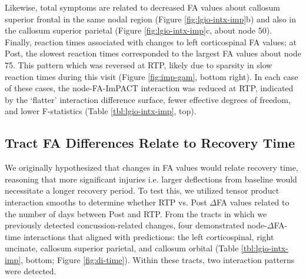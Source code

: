 \documentclass[]{imag-ms-template}
\begin{document}
\begin{table}[H]
	\scriptsize
	
	\caption{Longitudinal tract interaction statistics. \textbf{Top}: Tract by ImPACT metric interaction. While significant non-flatness is detected for all ImPACT-Node interactions, note the reduction in effective degrees of freedom and F-stat between Post and RTP. VisMem = Visual Memory, TotSymp = Total Symptom, RxTime = Reaction Time. Node = global node, ImP:Base/Post/RTP = main effects of ImPACT metric for each group, ImP-Node = interaction term of node and ImPACT, ImP-Node:O.Post/RTP = Post/RTP group interaction as an ordered factor (relative to Base). \textbf{Bottom}: Interaction of select tracts and days between Post and RTP. edf = effective degrees of freedom, F = F-statistic, Sig = significance. *** = p$<$.001, ** = p$<$.01, * = p$<$.05. See Figure \ref{fig:ldi-gam} for tract names.}
	\label{tbl:lgio-intx-imp}
\end{table}

Likewise, total symptoms are related to decreased FA values about callosum superior frontal in the same nodal region (Figure \ref{fig:lgio-intx-imp}b) and also in the callosum superior parietal (Figure \ref{fig:lgio-intx-imp}c, about node 50). Finally, reaction times associated with changes to left corticospinal FA values; at Post, the slowest reaction times corresponded to the largest FA values about node 75. This pattern which was reversed at RTP, likely due to sparsity in slow reaction times during this visit (Figure \ref{fig:imp-gam}, bottom right). In each case of these cases, the node-FA-ImPACT interaction was reduced at RTP, indicated by the `flatter' interaction difference surface, fewer effective degrees of freedom, and lower F-statistics (Table \ref{tbl:lgio-intx-imp}, top).


\subsection{Tract FA Differences Relate to Recovery Time}
\label{ssec:res-dwi-time}
We originally hypothesized that changes in FA values would relate recovery time, reasoning that more significant injuries i.e. larger deflections from baseline would necessitate a longer recovery period. To test this, we utilized tensor product interaction smooths to determine whether RTP vs. Post $\Delta$FA values related to the number of days between Post and RTP. From the tracts in which we previously detected concussion-related changes, four demonstrated node-$\Delta$FA-time interactions that aligned with predictions: the left corticospinal, right uncinate, callosum superior parietal, and callosum orbital (Table \ref{tbl:lgio-intx-imp}, bottom; Figure \ref{fig:di-time}). Within these tracts, two interaction patterns were detected.
\end{document}
